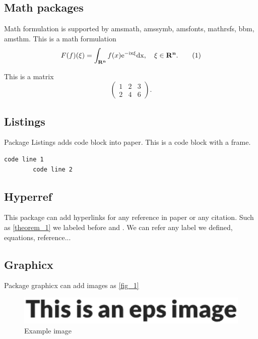 \documentclass{article}
\begin{document}
    \subsection{Math packages}
    Math formulation is supported by amsmath, amssymb, amsfonts, mathrsfs, bbm, amsthm.
    This is a math formulation
    \begin{align}
        F(f)(\xi)=\int_{\bf{R}^n} f(x)\rm e^{-\rm i x\xi}\rm dx,\quad \xi\in\bf{R}^n. \tag{1}
    \end{align}

    This is a matrix
    $$
    \begin{pmatrix}
        1 & 2 & 3\\
        2 & 4 & 6
    \end{pmatrix}.
    $$
    
    \subsection{Listings}
    Package Listings adds code block into paper.
    This is a code block with a frame.
    \begin{lstlisting}[frame = single]
        code line 1
        code line 2
    \end{lstlisting}

    \subsection{Hyperref}
    This package can add hyperlinks for any reference in paper or any citation.
    Such as \autoref{theorem_1} we labeled before and \cite{referencekey}. We can refer any label we defined, equations, reference...

    \subsection{Graphicx}
    Package graphicx can add images as \autoref{fig_1}

    \begin{figure}[htbp] %
        \centering %
        \includegraphics[width=\linewidth]{example} 
        \caption{Example image} %
        \label{fig_1}
    \end{figure}
    
\end{document}
